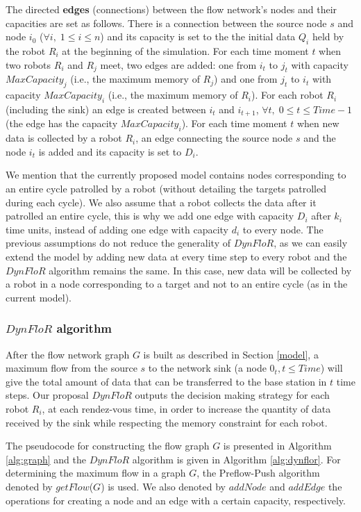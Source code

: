 The directed \textbf{edges} (connections) between the flow network's nodes and their capacities are set as follows. There is a connection between the source node $s$ and node $i_0$ ($\forall i, \;1 \leq i \leq n$) and its capacity is set to the the initial data $Q_i$ held by the robot $R_i$ at the beginning of the simulation. For each time moment $t$ when two robots $R_i$ and $R_j$ meet, two edges are added: one from $i_t$ to $j_t$ with capacity $\mathit{MaxCapacity_j}$ (i.e., the maximum memory of $R_j$) and one from $j_t$ to $i_t$ with capacity $\mathit{MaxCapacity_i}$ (i.e., the maximum memory of $R_i$). For each robot $R_i$ (including the sink) an edge is created between $i_t$ and $i_{t+1}$, $\forall t,\; 0 \leq t \leq Time-1$ (the edge has the capacity $\mathit{MaxCapacity_i}$). For each time moment $t$ when new data is collected by a robot $R_i$, an edge connecting the source node $s$ and the node $i_t$ is added and its capacity is set to $D_i$.      

We mention that the currently proposed model contains nodes corresponding to an entire cycle patrolled by a robot (without detailing the targets patrolled during each cycle). We also assume that a robot collects the data after it patrolled an entire cycle, this is why we add one edge with capacity $D_i$ after $k_i$ time units, instead of adding one edge with capacity $d_i$ to every node. The previous assumptions do not reduce the generality of $DynFloR$, as we can easily extend the model by adding new data at every time step to every robot and the $DynFloR$ algorithm remains the same. In this case, new data will be collected by a robot in a node corresponding to a target and not to an entire cycle (as in the current model).  

\subsubsection{$DynFloR$ algorithm}\label{dynflor}

After the flow network graph $G$ is built as described in Section \ref{model}, a maximum flow \cite{flow} from the source $s$ to the network sink (a node $0_t, t\leq Time$) will give the total amount of data that can be transferred to the base station in $t$ time steps.
Our proposal $\mathit{DynFloR}$ outputs the decision making strategy for each robot $R_i$, at each rendez-vous time, in order to increase the quantity of data received by the sink while respecting the memory constraint for each robot. 

The pseudocode for constructing the flow graph $G$ is presented in Algorithm \ref{alg:graph} and the $DynFloR$ algorithm is given in Algorithm \ref{alg:dynflor}. For determining the maximum flow in a graph $G$, the Preflow-Push algorithm \cite{Preflow} denoted by $getFlow$($G$) is used.  We also denoted by $addNode$ and $addEdge$ the operations for creating a node and an edge with a certain capacity, respectively. 

